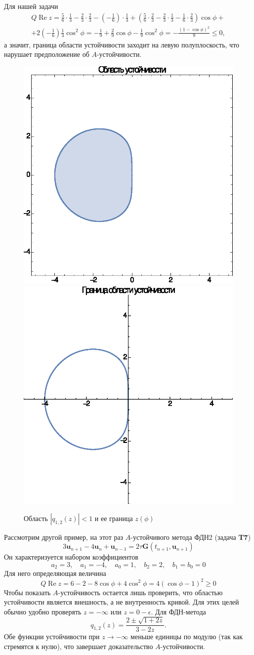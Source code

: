 \documentclass[12pt]{article}
\renewcommand{\vec}[1]{\boldsymbol{\mathbf{#1}}}
\begin{document}
Для нашей задачи
\begin{multline*}
Q \operatorname{Re} z = \frac{5}{6}\cdot\frac{1}{3} - \frac{2}{3}\cdot\frac{2}{3} - \left(-\frac{1}{6}\right)\cdot\frac{1}{3} + 
\left(\frac{5}{6}\cdot\frac{2}{3} - \frac{2}{3} \cdot \frac{1}{3} - \frac{1}{6}\cdot\frac{2}{3}\right)\cos \phi + \\ +
2 \left(-\frac{1}{6}\right) \frac{1}{3} \cos^2 \phi = -\frac{1}{9} + \frac{2}{9}\cos \phi - \frac{1}{9}\cos^2 \phi = -\frac{(1 - \cos \phi)^2}{9} \leqslant 0,
\end{multline*}
а значит, граница области устойчивости заходит на левую полуплоскость, что нарушает предположение об $A$-устойчивости.

\begin{figure}[ht!]
\centering
\includegraphics[width=.45\textwidth]{test_gr1.eps}\quad%
\includegraphics[width=.45\textwidth]{test_gr2.eps}
\caption{Область $|q_{1,2}(z)| < 1$ и ее граница $z(\phi)$} 
\end{figure}

Рассмотрим другой пример, на этот раз $A$-устойчивого метода ФДН2 (задача \textbf{T7})
\[
3 \vec u_{n+1} - 4 \vec u_n + \vec u_{n-1} = 2 \tau \vec G(t_{n+1}, \vec u_{n+1})
\]
Он характеризуется набором коэффициентов 
\[
a_2 = 3, \quad a_1 = -4, \quad a_0 = 1, \quad b_2 = 2, \quad b_1 = b_0 = 0
\]
Для него определяющая величина
\[
Q \operatorname{Re} z = 6 - 2 - 8 \cos \phi + 4 \cos^2 \phi = 4 (\cos \phi - 1)^2 \geqslant 0
\]
Чтобы показать $A$-устойчивость остается лишь проверить, что областью
устойчивости является внешность, а не внутренность кривой. Для этих целей обычно
удобно проверять $z = -\infty$ или $z = 0-\epsilon$.
Для ФДН-метода
\[
q_{1,2}(z) = \frac{2 \pm \sqrt{1 + 2z}}{3 - 2z}.
\]
Обе функции устойчивости при $z \rightarrow -\infty$ меньше единицы по модулю (так как стремятся к нулю), что завершает доказательство $A$-устойчивости.
\end{document}

